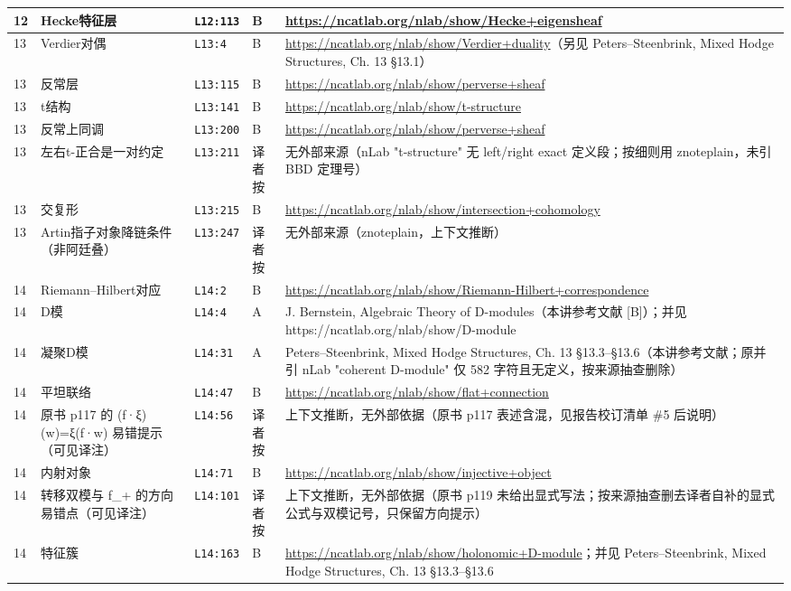 \begin{longtable}{@{}p{1.0cm}p{3.3cm}p{1.5cm}p{1.3cm}p{7.9cm}@{}}
12 & Hecke特征层 & \texttt{L12:113} & B & \url{https://ncatlab.org/nlab/show/Hecke+eigensheaf} \\
\midrule
13 & Verdier对偶 & \texttt{L13:4} & B & \url{https://ncatlab.org/nlab/show/Verdier+duality}（另见 Peters–Steenbrink, Mixed Hodge Structures, Ch. 13 §13.1） \\
13 & 反常层 & \texttt{L13:115} & B & \url{https://ncatlab.org/nlab/show/perverse+sheaf} \\
13 & t结构 & \texttt{L13:141} & B & \url{https://ncatlab.org/nlab/show/t-structure} \\
13 & 反常上同调 & \texttt{L13:200} & B & \url{https://ncatlab.org/nlab/show/perverse+sheaf} \\
13 & 左右t-正合是一对约定 & \texttt{L13:211} & 译者按 & 无外部来源（nLab "t-structure" 无 left/right exact 定义段；按细则用 znoteplain，未引 BBD 定理号） \\
13 & 交复形 & \texttt{L13:215} & B & \url{https://ncatlab.org/nlab/show/intersection+cohomology} \\
13 & Artin指子对象降链条件（非阿廷叠） & \texttt{L13:247} & 译者按 & 无外部来源（znoteplain，上下文推断） \\
\midrule
14 & Riemann–Hilbert对应 & \texttt{L14:2} & B & \url{https://ncatlab.org/nlab/show/Riemann-Hilbert+correspondence} \\
14 & D模 & \texttt{L14:4} & A & J. Bernstein, Algebraic Theory of D-modules（本讲参考文献 [B]）；并见 https://ncatlab.org/nlab/show/D-module \\
14 & 凝聚D模 & \texttt{L14:31} & A & Peters–Steenbrink, Mixed Hodge Structures, Ch. 13 §13.3–§13.6（本讲参考文献；原并引 nLab "coherent D-module" 仅 582 字符且无定义，按来源抽查删除） \\
14 & 平坦联络 & \texttt{L14:47} & B & \url{https://ncatlab.org/nlab/show/flat+connection} \\
14 & 原书 p117 的 (f·ξ)(w)=ξ(f·w) 易错提示（可见译注） & \texttt{L14:56} & 译者按 & 上下文推断，无外部依据（原书 p117 表述含混，见报告校订清单 \#5 后说明） \\
14 & 内射对象 & \texttt{L14:71} & B & \url{https://ncatlab.org/nlab/show/injective+object} \\
14 & 转移双模与 f\_+ 的方向易错点（可见译注） & \texttt{L14:101} & 译者按 & 上下文推断，无外部依据（原书 p119 未给出显式写法；按来源抽查删去译者自补的显式公式与双模记号，只保留方向提示） \\
14 & 特征簇 & \texttt{L14:163} & B & \url{https://ncatlab.org/nlab/show/holonomic+D-module}；并见 Peters–Steenbrink, Mixed Hodge Structures, Ch. 13 §13.3–§13.6 \\

\end{longtable}
